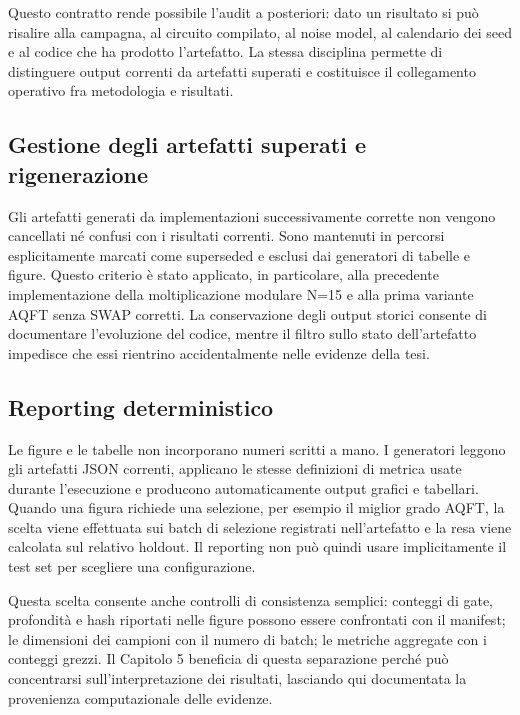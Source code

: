 Questo contratto rende possibile l'audit a posteriori: dato un risultato si può risalire alla campagna, al circuito compilato, al noise model, al calendario dei seed e al codice che ha prodotto l'artefatto. La stessa disciplina permette di distinguere output correnti da artefatti superati e costituisce il collegamento operativo fra metodologia e risultati.

\subsection{Gestione degli artefatti superati e rigenerazione}\label{sec:finale_4_8_1}

Gli artefatti generati da implementazioni successivamente corrette non vengono cancellati né confusi con i risultati correnti. Sono mantenuti in percorsi esplicitamente marcati come superseded e esclusi dai generatori di tabelle e figure. Questo criterio è stato applicato, in particolare, alla precedente implementazione della moltiplicazione modulare N=15 e alla prima variante AQFT senza SWAP corretti. La conservazione degli output storici consente di documentare l'evoluzione del codice, mentre il filtro sullo stato dell'artefatto impedisce che essi rientrino accidentalmente nelle evidenze della tesi.

\subsection{Reporting deterministico}\label{sec:finale_4_8_2}

Le figure e le tabelle non incorporano numeri scritti a mano. I generatori leggono gli artefatti JSON correnti, applicano le stesse definizioni di metrica usate durante l'esecuzione e producono automaticamente output grafici e tabellari. Quando una figura richiede una selezione, per esempio il miglior grado AQFT, la scelta viene effettuata sui batch di selezione registrati nell'artefatto e la resa viene calcolata sul relativo holdout. Il reporting non può quindi usare implicitamente il test set per scegliere una configurazione.

Questa scelta consente anche controlli di consistenza semplici: conteggi di gate, profondità e hash riportati nelle figure possono essere confrontati con il manifest; le dimensioni dei campioni con il numero di batch; le metriche aggregate con i conteggi grezzi. Il Capitolo 5 beneficia di questa separazione perché può concentrarsi sull'interpretazione dei risultati, lasciando qui documentata la provenienza computazionale delle evidenze.

